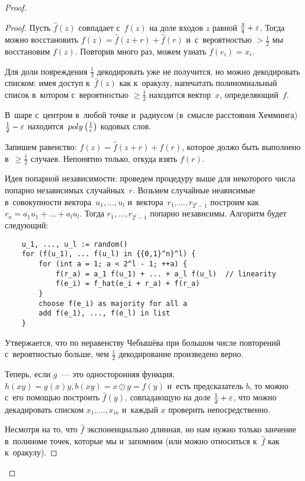 \documentclass{article}
\begin{document}
\begin{proof}
\begin{proof}
		Пусть $\hat{f}(z)$ совпадает с~$f(z)$ на доле входов $z$ равной	$\frac{3}{4}
		+ \varepsilon$. Тогда можно восстановить $f(z) = \hat{f}(z + r) + \hat{f}(r)$
		и~с~вероятностью $>\frac{1}{2}$ мы восстановим $f(z)$. Повторив много раз,
		можем узнать $f(e_i) = x_i$.

		Для доли повреждения $\frac{1}{2}$ декодировать уже не получится, но можно
		декодировать списком: имея доступ к~$\hat{f}(z)$ как к~оракулу, напечатать
		полиномиальный список в~котором с~вероятностью $\ge \frac{1}{2}$ находится
		вектор~$x$, определяющий~$f$.

		\begin{problem}
			В~шаре с~центром в~любой точке и~радиусом (в~смысле расстояния Хемминга)
			$\frac{1}{2} - \varepsilon$ находится~$poly\left(\frac{1}{\varepsilon}\right)$ кодовых
			слов.
		\end{problem}

		Запишем равенство: $f(z) = \hat{f}(z + r) + f(r)$, которое должо быть
		выполнено в~$\ge \frac{1}{2}$ случаев. Непонятно только, откуда взять
		$f(r)$.

		Идея попарной независимости: проведем процедуру выше для некоторого числа
		попарно независимых случайных~$r$. Возьмем случайные неависимые
		в~совокупности вектора~$u_1, \ldots, u_l$ и~вектора~$r_1, \ldots, r_{2^l -
		1}$ построим как~$r_a = a_1 u_1 + \ldots + a_l u_l$. Тогда $r_1, \ldots,
		r_{2^l - 1}$ попарно независимы. Алгоритм будет следующий:

		\begin{verbatim}
	u_1, ..., u_l := random()
	for (f(u_1), ... f(u_l) in {{0,1}^n}^l) {
		for (int a = 1; a < 2^l - 1; ++a) {
			f(r_a) = a_1 f(u_1) + ... + a_l f(u_l)  // linearity
			f(e_i) = f_hat(e_i + r_a) + f(r_a)
		}
		choose f(e_i) as majority for all a
		add f(e_1), ..., f(e_l) in list
	}
		\end{verbatim}

		Утвержается, что по неравенству Чебышёва при большом числе
		повторений с~вероятностью больше, чем $\frac{1}{2}$ декодирование
		произведено верно.

		Теперь, если $g$~--- это односторонняя функция, $h(xy) = g(x)y, b(xy) = x
		\odot y = f(y)$ и~есть предсказатель $b$, то можно с~его помощью построить
		$\hat{f}(y)$, совпадающую на доле $\frac{1}{2} + \varepsilon$, что можно
		декадировать списком $x_1, \ldots, x_m$ и~каждый $x$ проверить
		непосредственно.

		Несмотря на то, что $\hat{f}$ экспоненциально длинная, но нам нужно только
		занчение в~полиноме точек, которые мы и~запомним (или можно относиться
		к~$\hat{f}$ как к~оракулу).

	\end{proof}
\end{proof}
\end{document}
